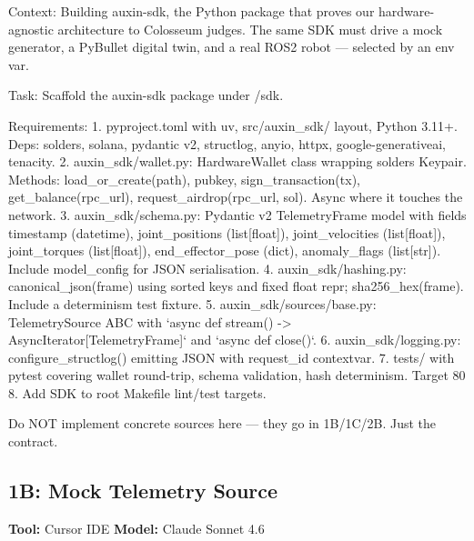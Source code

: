 \documentclass[11pt, a4paper]{article}
\begin{document}
\begin{promptbox}
Context: Building auxin-sdk, the Python package that proves our hardware-agnostic architecture to Colosseum judges. The same SDK must drive a mock generator, a PyBullet digital twin, and a real ROS2 robot --- selected by an env var.

Task: Scaffold the auxin-sdk package under /sdk.

Requirements:
1. pyproject.toml with uv, src/auxin_sdk/ layout, Python 3.11+. Deps: solders, solana, pydantic v2, structlog, anyio, httpx, google-generativeai, tenacity.
2. auxin_sdk/wallet.py: HardwareWallet class wrapping solders Keypair. Methods: load_or_create(path), pubkey, sign_transaction(tx), get_balance(rpc_url), request_airdrop(rpc_url, sol). Async where it touches the network.
3. auxin_sdk/schema.py: Pydantic v2 TelemetryFrame model with fields timestamp (datetime), joint_positions (list[float]), joint_velocities (list[float]), joint_torques (list[float]), end_effector_pose (dict), anomaly_flags (list[str]). Include model_config for JSON serialisation.
4. auxin_sdk/hashing.py: canonical_json(frame) using sorted keys and fixed float repr; sha256_hex(frame). Include a determinism test fixture.
5. auxin_sdk/sources/base.py: TelemetrySource ABC with `async def stream() -> AsyncIterator[TelemetryFrame]` and `async def close()`.
6. auxin_sdk/logging.py: configure_structlog() emitting JSON with request_id contextvar.
7. tests/ with pytest covering wallet round-trip, schema validation, hash determinism. Target 80%
8. Add SDK to root Makefile lint/test targets.

Do NOT implement concrete sources here --- they go in 1B/1C/2B. Just the contract.
\end{promptbox}

\subsection*{1B: Mock Telemetry Source}
\textbf{Tool:} Cursor IDE \quad \textbf{Model:} Claude Sonnet 4.6
\end{document}
